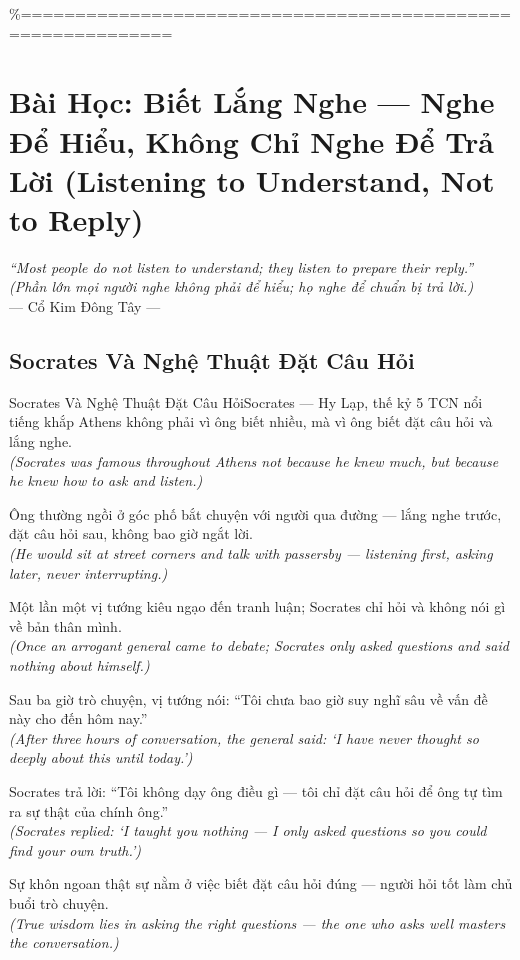 \%============================================================
\chapter{Bài Học: Biết Lắng Nghe --- Nghe Để Hiểu, Không Chỉ Nghe Để Trả Lời (Listening to Understand, Not to Reply)}
\begin{center}
  \textit{\color{truyengold}``Most people do not listen to understand; they listen to prepare their reply.''}\\[4pt]
  \textit{(Phần lớn mọi người nghe không phải để hiểu; họ nghe để chuẩn bị trả lời.)}\\[4pt]
  \small\color{truyenblue}--- Cổ Kim Đông Tây ---
\end{center}
\ngancach

\section{Socrates Và Nghệ Thuật Đặt Câu Hỏi}
\begin{truyen}{Socrates Và Nghệ Thuật Đặt Câu Hỏi}{Socrates --- Hy Lạp, thế kỷ 5 TCN}
 nổi tiếng khắp Athens không phải vì ông biết nhiều, mà vì ông biết đặt câu hỏi và lắng nghe.\\[4pt]
\textit{(Socrates was famous throughout Athens not because he knew much, but because he knew how to ask and listen.)}

Ông thường ngồi ở góc phố bắt chuyện với người qua đường --- lắng nghe trước, đặt câu hỏi sau, không bao giờ ngắt lời.\\[4pt]
\textit{(He would sit at street corners and talk with passersby --- listening first, asking later, never interrupting.)}

Một lần một vị tướng kiêu ngạo đến tranh luận; Socrates chỉ hỏi và không nói gì về bản thân mình.\\[4pt]
\textit{(Once an arrogant general came to debate; Socrates only asked questions and said nothing about himself.)}

Sau ba giờ trò chuyện, vị tướng nói: ``Tôi chưa bao giờ suy nghĩ sâu về vấn đề này cho đến hôm nay.''\\[4pt]
\textit{(After three hours of conversation, the general said: `I have never thought so deeply about this until today.')}

Socrates trả lời: ``Tôi không dạy ông điều gì --- tôi chỉ đặt câu hỏi để ông tự tìm ra sự thật của chính ông.''\\[4pt]
\textit{(Socrates replied: `I taught you nothing --- I only asked questions so you could find your own truth.')}

\end{truyen}
\begin{baihoc}
  Sự khôn ngoan thật sự nằm ở việc biết đặt câu hỏi đúng --- người hỏi tốt làm chủ buổi trò chuyện.\\[4pt]
  \textit{(True wisdom lies in asking the right questions --- the one who asks well masters the conversation.)}
\end{baihoc}

